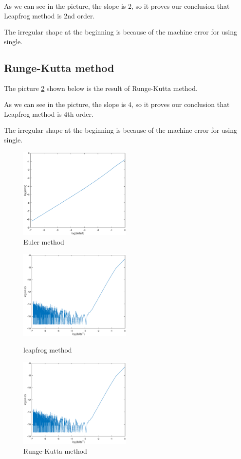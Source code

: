 \documentclass[12pt]{article}%
\begin{document}
As we can see in the picture, the slope is 2, so it proves our conclusion that Leapfrog method is 2nd order.

The irregular shape at the beginning is because of the machine error for using single.

\subsection{Runge-Kutta method}

The picture \ref{rk1} shown below is the result of Runge-Kutta method.

As we can see in the picture, the slope is 4, so it proves our conclusion that Leapfrog method is 4th order.

The irregular shape at the beginning is because of the machine error for using single.

\begin{figure}
\centering
\includegraphics[width=2.2in]{euler1.eps} 
\caption{Euler method}  
\label{euler1}
\end{figure}

\begin{figure}
\begin{minipage}[t]{0.5\textwidth}
\centering
\includegraphics[width=2.2in]{leapfrog1.eps}
\caption{leapfrog method}
\label{leapfrog1}
\end{minipage}%
\begin{minipage}[t]{0.5\textwidth}
\centering
\includegraphics[width=2.2in]{rk1.eps}
\caption{Runge-Kutta method}
\label{rk1}
\end{minipage}
\end{figure}
\newpage
\end{document}

